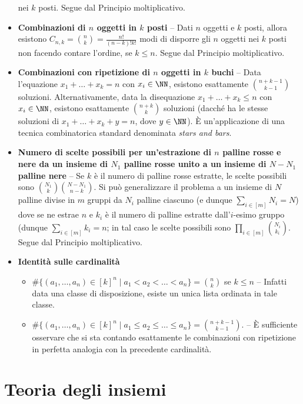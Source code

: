 \begin{multicols*}{2}
\begin{itemize}
    nei $k$ posti. Segue dal Principio moltiplicativo.
    \item \textbf{Combinazioni di $n$ oggetti in $k$ posti} -- Dati $n$ oggetti
    e $k$ posti, allora esistono $C_{n,k} = \binom{n}{k} = \frac{n!}{(n-k)!k!}$ modi di disporre gli $n$ oggetti nei
    $k$ posti non facendo contare l'ordine, se $k \leq n$. Segue dal Principio
    moltiplicativo.
    \item \textbf{Combinazioni con ripetizione di $n$ oggetti in $k$ buchi} -- Data
    l'equazione $x_1 + \ldots + x_k = n$ con $x_i \in \NN$, esistono esattamente
    $\binom{n+k-1}{k-1}$ soluzioni. Alternativamente, data la disequazione
    $x_1 + \ldots + x_k \leq n$ con $x_i \in \NN$, esistono esattamente
    $\binom{n+k}{k}$ soluzioni (dacché ha le stesse soluzioni di
    $x_1 + \ldots + x_k + y = n$, dove $y \in \NN$). È un'applicazione di una
    tecnica combinatorica standard denominata \textit{stars and bars}.
    \item \textbf{Numero di scelte possibili per un'estrazione di $n$ palline rosse e nere da un insieme di $N_1$ palline rosse unito a un insieme di $N-N_1$ palline nere} -- Se $k$ è il numero di palline rosse estratte, le scelte possibili sono
    $\binom{N_1}{k} \binom{N - N_1}{n-k}$. Si può generalizzare il problema a
    un insieme di $N$ palline divise in $m$ gruppi da $N_i$ palline ciascuno
    (e dunque $\sum_{i \in [m]} N_i = N$) dove se ne estrae $n$ e $k_i$ è il
    numero di palline estratte dall'$i$-esimo gruppo (dunque $\sum_{i \in [m]} k_i = n$;
    in tal caso le scelte possibili sono $\prod_{i \in [m]} \binom{N_i}{k_i}$. Segue
    dal Principio moltiplicativo.
    \item \textbf{Identità sulle cardinalità}
\begin{itemize}
    \item $\#\{(a_1, \ldots, a_n) \in [k]^n \mid a_1 < a_2 < \ldots < a_n\} = \binom{n}{k}$ se $k \leq n$ -- Infatti data una classe di disposizione, esiste un unica lista ordinata
    in tale classe.
    \item $\#\{(a_1, \ldots, a_n) \in [k]^n \mid a_1 \leq a_2 \leq \ldots \leq a_n\} = \binom{n + k - 1}{k - 1}$. -- È sufficiente osservare che si sta
    contando esattamente le combinazioni con ripetizione in perfetta analogia con la precedente
    cardinalità.
\end{itemize}
\end{itemize}

\section*{Teoria degli insiemi}


\end{multicols*}
